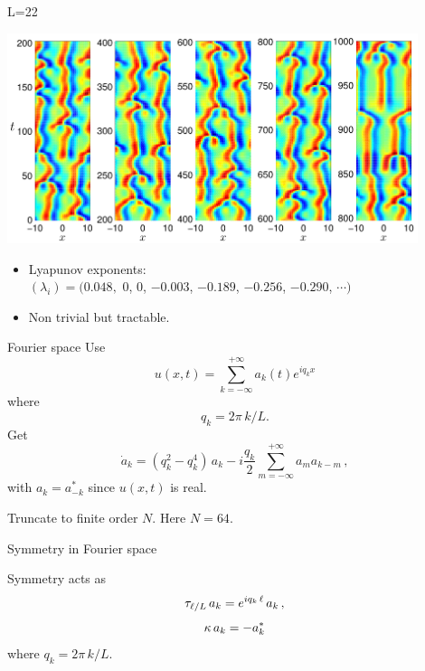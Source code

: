 \documentclass{beamer}
\begin{document}
\begin{frame}{L=22}
\begin{center}
  \includegraphics[width=0.9\textwidth]{../../figs/ks_L22_long_orbit}
\end{center}

\begin{block}{} 
 \begin{itemize}
  \item Lyapunov exponents: \\
	$(\lambda_i) = (0.048,$ 0, 0, $-0.003$, $-0.189$, $-0.256$, $-0.290$, $\cdots)$
  \item Non trivial but tractable.	
 \end{itemize}

\end{block}
 
\end{frame}

\begin{frame}{Fourier space}
Use
\[
  u(x,t)=\sum_{k=-\infty}^{+\infty} a_k (t) e^{ i q_k x }
\]
where
\[
 q_k = 2\pi\,k/L.
\]
Get
\[
 \dot{a}_k
     = ( q_k^2 - q_k^4 )\, a_k
    - i \frac{q_k}{2} \sum_{m=-\infty}^{+\infty} a_m a_{k-m}\,,
\]
with $a_{k}=a^\ast_{-k}$ since $u(x,t)$ is real.

Truncate to finite order $N$. Here $N=64$.
\end{frame}

\begin{frame}{Symmetry in Fourier space}

Symmetry acts as
\[
  \tau_{\ell/L}\, a_k = e^{i q_k\, \ell} \, a_k \,,
  \label{eq:shiftF}
\]
\[
   \kappa \, a_k = -a_k^\ast
\]
where $q_k = 2\pi\,k/L$.

\end{frame}
\end{document}
